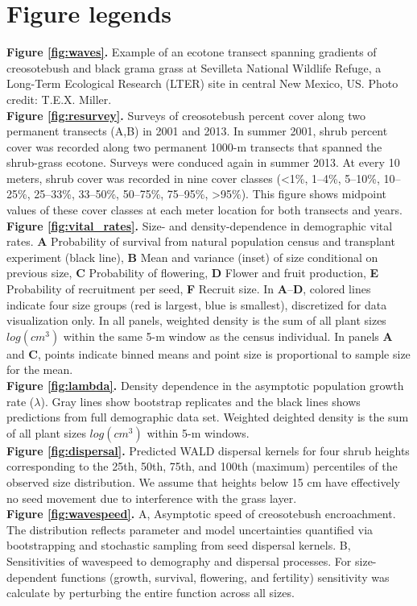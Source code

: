 \documentclass[11pt]{article}\usepackage[]{graphicx}\usepackage[usenames,dvipsnames]{xcolor}
\begin{document}



\newpage
\section*{Figure legends}
\noindent{} \textbf{Figure \ref{fig:waves}.} Example of an ecotone transect spanning gradients of creosotebush and black grama grass at Sevilleta National Wildlife Refuge, a Long-Term Ecological Research (LTER) site in central New Mexico, US. Photo credit: T.E.X. Miller.
\\
\noindent{} \textbf{Figure \ref{fig:resurvey}.} Surveys of creosotebush percent cover along two permanent transects (A,B) in 2001 and 2013. 
In summer 2001, shrub percent cover was recorded along two permanent 1000-m transects that spanned the shrub-grass ecotone. 
Surveys were conduced again in summer 2013. 
At every 10 meters, shrub cover was recorded in nine cover classes (<1\%, 1--4\%, 5--10\%, 10--25\%, 25--33\%, 33--50\%, 50--75\%, 75--95\%, >95\%). 
This figure shows midpoint values of these cover classes at each meter location for both transects and years. 
\\
\noindent{} \textbf{Figure \ref{fig:vital_rates}.} Size- and density-dependence in demographic vital rates. \textbf{A} Probability of survival from natural population census and transplant experiment (black line), \textbf{B} Mean and variance (inset) of size conditional on previous size, \textbf{C} Probability of flowering, \textbf{D} Flower and fruit production, \textbf{E} Probability of recruitment per seed, \textbf{F} Recruit size.  In \textbf{A}--\textbf{D}, colored lines indicate four size groups (red is largest, blue is smallest), discretized for data visualization only. In all panels, weighted density is the sum of all plant sizes $log(cm^3)$ within the same 5-m window as the census individual. In panels \textbf{A} and \textbf{C}, points indicate binned means and point size is proportional to sample size for the mean.
\\
\noindent{} \textbf{Figure \ref{fig:lambda}.} Density dependence in the asymptotic population growth rate ($\lambda$). Gray lines show bootstrap replicates and the black lines shows predictions from full demographic data set. Weighted deighted density is the sum of all plant sizes $log(cm^3)$ within 5-m windows.
\\
\noindent{} \textbf{Figure \ref{fig:dispersal}.} Predicted WALD dispersal kernels for four shrub heights corresponding to the 25th, 50th, 75th, and 100th (maximum) percentiles of the observed size distribution. We assume that heights below 15 cm have effectively no seed movement due to interference with the grass layer.
\\
\noindent{} \textbf{Figure \ref{fig:wavespeed}.} A, Asymptotic speed of creosotebush encroachment. The distribution reflects parameter and model uncertainties quantified via bootstrapping and stochastic sampling from seed dispersal kernels. B, Sensitivities of wavespeed to demography and dispersal processes. For size-dependent functions (growth, survival, flowering, and fertility) sensitivity was calculate by perturbing the entire function across all sizes.
\end{document}
